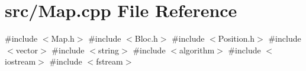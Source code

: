 \section{src/\+Map.cpp File Reference}
\label{_map_8cpp}
{\ttfamily \#include $<$Map.\+h$>$}\newline
{\ttfamily \#include $<$Bloc.\+h$>$}\newline
{\ttfamily \#include $<$Position.\+h$>$}\newline
{\ttfamily \#include $<$vector$>$}\newline
{\ttfamily \#include $<$string$>$}\newline
{\ttfamily \#include $<$algorithm$>$}\newline
{\ttfamily \#include $<$iostream$>$}\newline
{\ttfamily \#include $<$fstream$>$}\newline
